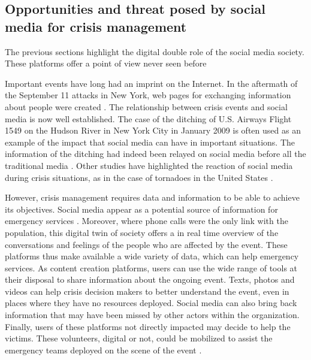\subsection{Opportunities and threat posed by social media for crisis management}
The previous sections highlight the digital double role of the social media society.
These platforms offer a point of view never seen before

Important events have long had an imprint on the Internet.
In the aftermath of the September 11 attacks in New York, web pages for exchanging information about people were created \cite{palenCitizenCommunicationsCrisis2007}.
The relationship between crisis events and social media is now well established.
The case of the ditching of U.S. Airways Flight 1549 on the Hudson River in New York City in January 2009 is often used as an example of the impact that social media can have in important situations.
The information of the ditching had indeed been relayed on social media before all the traditional media \cite{murthyTwitter2018}.
Other studies have highlighted the reaction of social media during crisis situations, as in the case of tornadoes in the United States \cite{justinei.blanfordTweetingTornadoes2014}.

However, crisis management requires data and information to be able to achieve its objectives.
Social media appear as a potential source of information for emergency services \cite{tapiaSeekingTrustworthyTweet2011a}.
Moreover, where phone calls were the only link with the population, this digital twin of society offers a in real time overview of the conversations and feelings of the people who are affected by the event.
These platforms thus make available a wide variety of data, which can help emergency services.
As content creation platforms, users can use the wide range of tools at their disposal to share information about the ongoing event.
Texts, photos and videos can help crisis decision makers to better understand the event, even in places where they have no resources deployed.
Social media can also bring back information that may have been missed by other actors within the organization.
Finally, users of these platforms not directly impacted may decide to help the victims.
These volunteers, digital or not, could be mobilized to assist the emergency teams deployed on the scene of the event \cite{batardIntegrerContributionsCitoyennes2021}.

